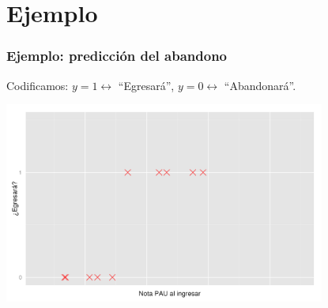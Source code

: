 \documentclass{beamer}
\begin{document}
 \section{Ejemplo}
 \begin{frame}\frametitle{Ejemplo: predicción del abandono}
   \begin{overlayarea}{\textwidth}{0.6cm}  
   Codificamos: $y=1\leftrightarrow$ ``Egresará'', $y=0\leftrightarrow$ ``Abandonará''.  
 \end{overlayarea}
\begin{center}
  \includegraphics[height=6.6cm]{egresara1.png}
\end{center}
    
 \end{frame}
 
\end{document}
